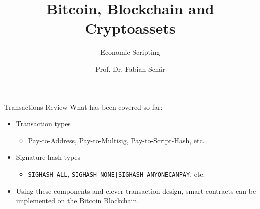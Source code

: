 \documentclass[handout]{beamer}
\title{Bitcoin, Blockchain and Cryptoassets}
\subtitle{Economic Scripting}
\author{Prof. Dr. Fabian Schär}
\institute{University of Basel}
\begin{document}
\thispagestyle{empty}
\begin{frame}[noframenumbering]
	\titlepage
\end{frame}


\begin{frame}{Transactions Review}
	What has been covered so far:
	\begin{itemize}
		\item<1 -> Transaction types
		\begin{itemize}
			\item<1 -> Pay-to-Address, Pay-to-Multisig, Pay-to-Script-Hash, etc.
		\end{itemize}
		\item<2 -> Signature hash types
		\begin{itemize}
			\item<2 -> \texttt{SIGHASH\_ALL}, \texttt{SIGHASH\_NONE|SIGHASH\_ANYONECANPAY}, etc.
		\end{itemize}
		\item<3 -> Using these components and clever transaction design, smart contracts can be implemented on the Bitcoin Blockchain.
	\end{itemize}
\end{frame}

\end{document}

